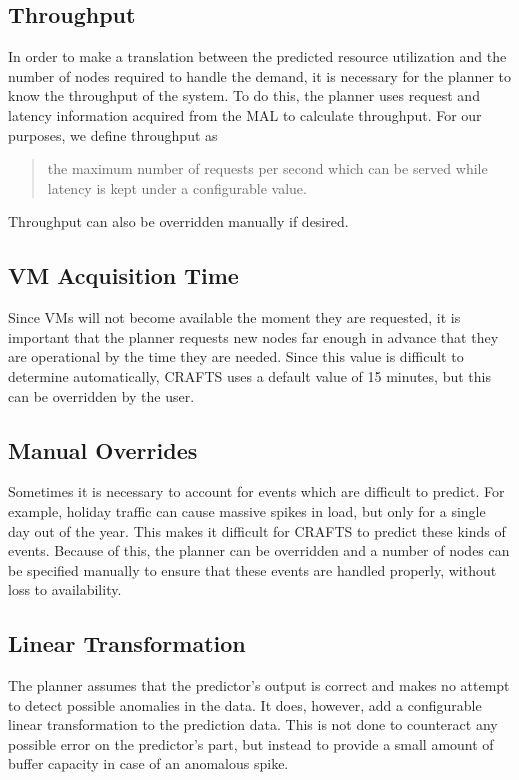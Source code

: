 \subsection{Throughput}
In order to make a translation between the predicted resource utilization and the number of nodes required to handle the demand, it is necessary for the \textsf{planner} to know the throughput of the system. To do this, the \textsf{planner} uses request and latency information acquired from the \textsf{MAL} to calculate throughput. For our purposes, we define throughput as
\begin{quote}
the maximum number of requests per second which can be served while latency is kept under a configurable value.
\end{quote}
Throughput can also be overridden manually if desired.

\subsection{VM Acquisition Time}
Since VMs will not become available the moment they are requested, it is important that the \textsf{planner} requests new nodes far enough in advance that they are operational by the time they are needed. Since this value is difficult to determine automatically, CRAFTS uses a default value of 15 minutes, but this can be overridden by the user.

\subsection{Manual Overrides}
Sometimes it is necessary to account for events which are difficult to predict. For example, holiday traffic can cause massive spikes in load, but only for a single day out of the year. This makes it difficult for CRAFTS to predict these kinds of events. Because of this, the \textsf{planner} can be overridden and a number of nodes can be specified manually to ensure that these events are handled properly, without loss to availability.

\subsection{Linear Transformation}
The \textsf{planner} assumes that the \textsf{predictor's} output is correct and makes no attempt to detect possible anomalies in the data. It does, however, add a configurable linear transformation to the prediction data. This is not done to counteract any possible error on the \textsf{predictor's} part, but instead to provide a small amount of buffer capacity in case of an anomalous spike.

